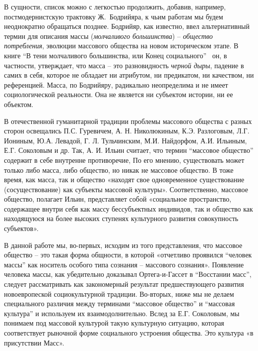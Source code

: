 В сущности, список можно с легкостью продолжить, добавив, например, постмодернистскую
трактовку Ж.~Бодрийяра, к чьим работам мы будем неоднократно обращаться позднее.
Бодрийяр, как известно, ввел альтернативный термин для описания массы (\emph{молчаливого большинства}) --
\emph{общество потребления}, эволюции массового общества на новом историческом этапе.
В книге ``В тени молчаливого большинства, или Конец социального''~\autocite{book:bodriyar} он, в частности,
утверждает, что масса -- это разновидность \emph{черной дыры}, падение в самих в
себя, которое не обладает ни атрибутом, ни предикатом, ни качеством, ни референцией.
Масса, по Бодрийяру, радикально неопределима и не имеет социологической реальности.
Она не является ни субъектом истории, ни ее объектом. 

В отечественной гуманитарной традиции проблемы массового общества с разных сторон освещались П.С. Гуревичем, А. Н. Николюкиным, К.Э. Разлоговым, Л.Г. Иониным, Ю.А. Левадой, Г. Л. Тульчинским, М.И. Найдорфом, А.И. Ильиным, Е.Г. Соколовым и др. Так, А. И. Ильин считает, что термин “массовое общество” содержит в себе внутренне противоречие, По его мнению, существовать может только либо масса, либо общество, но никак не массовое общество. В тоже время, как масса, так и общество «находят свое одновременное существование (сосуществование) как субъекты массовой культуры».\autocite[][79]{ilin2010} Соответственно, массовое общество, полагает Ильин, представляет собой «социальное пространство, содержащее внутри себя как массу бессубъектных индивидов, так и общество как находящуюся на более высоких ступенях культурного развития совокупность субъектов».\autocite[][79]{ilin2010} 

В данной работе мы, во-первых, исходим из того представления, что массовое общество – это такая форма общности, в которой «отчетливо проявился “человек массы” как носитель особого типа сознания – массового сознания».\autocite[][289]{kagan2007} Появление человека массы, как убедительно доказывал Ортега-и-Гассет в “Восстании масс”, следует рассматривать как закономерный результат предшествующего развития новоевропеской социокультурной традиции. Во-вторых, ниже мы не делаем специального различия между терминами “массовое общество” и “массовая культура” и используем их взаимодолнительно. Вслед за Е.Г. Соколовым\autocite{sokolov2002}, мы понимаем под массовой культурой такую культурную ситуацию, которая соответствует рыночной форме социального устроения общества\autocite[][20]{edoshina2000}. Это культура «в присутствии Масс».\autocite[][289]{kagan2007} 

